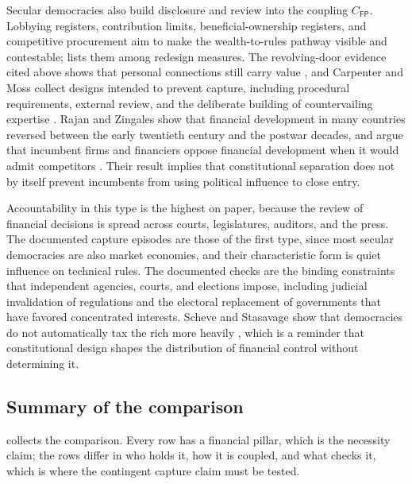 \documentclass[11pt,letterpaper]{article}
\theoremstyle{definition}
\theoremstyle{remark}
\newcommand{\pF}{\mathsf{F}}
\newcommand{\pP}{\mathsf{P}}
\begin{document}
Secular democracies also build disclosure and review into the coupling $C_{\pF\pP}$. Lobbying registers, contribution limits, beneficial-ownership registers, and competitive procurement aim to make the wealth-to-rules pathway visible and contestable; \citet{largo2026hbs} lists them among redesign measures. The revolving-door evidence cited above shows that personal connections still carry value \citep{blanes2012,bertrand2014}, and Carpenter and Moss collect designs intended to prevent capture, including procedural requirements, external review, and the deliberate building of countervailing expertise \citep{carpentermoss2014}. Rajan and Zingales show that financial development in many countries reversed between the early twentieth century and the postwar decades, and argue that incumbent firms and financiers oppose financial development when it would admit competitors \citep{rajan2003}. Their result implies that constitutional separation does not by itself prevent incumbents from using political influence to close entry.

Accountability in this type is the highest on paper, because the review of financial decisions is spread across courts, legislatures, auditors, and the press. The documented capture episodes are those of the first type, since most secular democracies are also market economies, and their characteristic form is quiet influence on technical rules. The documented checks are the binding constraints that independent agencies, courts, and elections impose, including judicial invalidation of regulations and the electoral replacement of governments that have favored concentrated interests. Scheve and Stasavage show that democracies do not automatically tax the rich more heavily \citep{scheve2016}, which is a reminder that constitutional design shapes the distribution of financial control without determining it.

\subsection{Summary of the comparison}

 collects the comparison. Every row has a financial pillar, which is the necessity claim; the rows differ in who holds it, how it is coupled, and what checks it, which is where the contingent capture claim must be tested.
\end{document}
